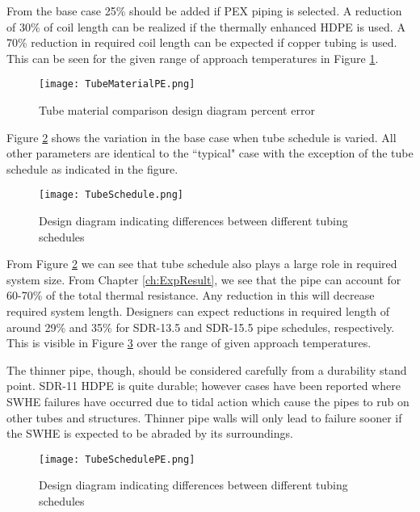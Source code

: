 From the base case 25\% should be added if PEX piping is selected. A reduction of 30\% of coil length can be realized if the thermally enhanced HDPE is used. A 70\% reduction in required coil length can be expected if copper tubing is used. This can be seen for the given range of approach temperatures in Figure \ref{fig:DesignTools:SpcCooling:TubeMaterialPE}.

	\begin{figure}
		\centering
		\texttt{[image: TubeMaterialPE.png]}
		\caption{Tube material comparison design diagram percent error}
		\label{fig:DesignTools:SpcCooling:TubeMaterialPE}
	\end{figure}

Figure \ref{fig:DesignTools:SpcCooling:TubeSchedule} shows the variation in the base case when tube schedule is varied. All other parameters are identical to the ``typical" case with the exception of the tube schedule as indicated in the figure.

	\begin{figure}
		\centering
		\texttt{[image: TubeSchedule.png]}
		\caption[Tube schedule comparison design diagram]{Design diagram indicating differences between different tubing schedules}
		\label{fig:DesignTools:SpcCooling:TubeSchedule}
	\end{figure}
	
From Figure \ref{fig:DesignTools:SpcCooling:TubeSchedule} we can see that tube schedule also plays a large role in required system size. From Chapter \ref{ch:ExpResult}, we see that the pipe can account for 60-70\% of the total thermal resistance. Any reduction in this will decrease required system length. Designers can expect reductions in required length of around 29\% and 35\% for SDR-13.5 and SDR-15.5 pipe schedules, respectively. This is visible in Figure \ref{fig:DesignTools:SpcCooling:TubeSchedulePE} over the range of given approach temperatures.

The thinner pipe, though, should be considered carefully from a durability stand point. SDR-11 HDPE is quite durable; however cases have been reported where SWHE failures have occurred due to tidal action which cause the pipes to rub on other tubes and structures. Thinner pipe walls will only lead to failure sooner if the SWHE is expected to be abraded by its surroundings.

	\begin{figure}
		\centering
		\texttt{[image: TubeSchedulePE.png]}
		\caption[Tube schedule comparison design diagram percent error]{Design diagram indicating differences between different tubing schedules}
		\label{fig:DesignTools:SpcCooling:TubeSchedulePE}
	\end{figure}

